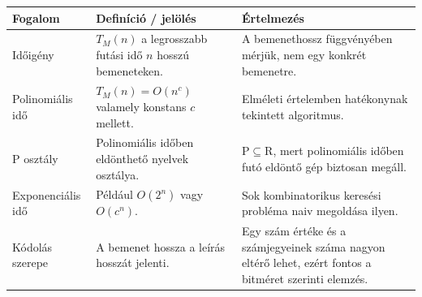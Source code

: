 \begin{tabularx}{\textwidth}{L{31mm}L{44mm}X}
\toprule
\textbf{Fogalom} & \textbf{Definíció / jelölés} & \textbf{Értelmezés} \\
\midrule
Időigény & $T_M(n)$ a legrosszabb futási idő $n$ hosszú bemeneteken. & A bemenethossz függvényében mérjük, nem egy konkrét bemenetre. \\
Polinomiális idő & $T_M(n)=O(n^c)$ valamely konstans $c$ mellett. & Elméleti értelemben hatékonynak tekintett algoritmus. \\
$\mathrm{P}$ osztály & Polinomiális időben eldönthető nyelvek osztálya. & $\mathrm{P}\subseteq\mathrm{R}$, mert polinomiális időben futó eldöntő gép biztosan megáll. \\
Exponenciális idő & Például $O(2^n)$ vagy $O(c^n)$. & Sok kombinatorikus keresési probléma naiv megoldása ilyen. \\
Kódolás szerepe & A bemenet hossza a leírás hosszát jelenti. & Egy szám értéke és a számjegyeinek száma nagyon eltérő lehet, ezért fontos a bitméret szerinti elemzés. \\
\bottomrule
\end{tabularx}
